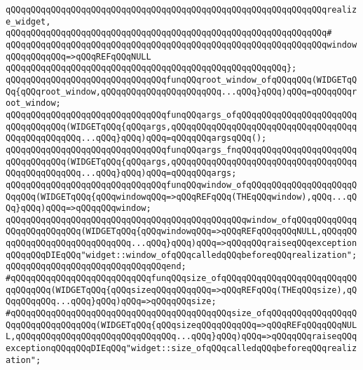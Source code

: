 \verb|qQQqqQQqqQQqqQQqqQQqqQQqqQQqqQQqqQQqqQQqqQQqqQQqqQQqqQQqqQQqqQQqrealize_widget,|\newline
\verb|qQQqqQQqqQQqqQQqqQQqqQQqqQQqqQQqqQQqqQQqqQQqqQQqqQQqqQQqqQQqqQQq#|\newline
\verb|qQQqqQQqqQQqqQQqqQQqqQQqqQQqqQQqqQQqqQQqqQQqqQQqqQQqqQQqqQQqqQQqwindowqQQqqQQqqQQq=>qQQqREFqQQqNULL|\newline
\verb|qQQqqQQqqQQqqQQqqQQqqQQqqQQqqQQqqQQqqQQqqQQqqQQqqQQqqQQq};|\newline
\newline
\verb|qQQqqQQqqQQqqQQqqQQqqQQqqQQqqQQqfunqQQqroot_window_ofqQQqqQQq(WIDGETqQQq{qQQqroot_window,qQQqqQQqqQQqqQQqqQQqqQQq...qQQq}qQQq)qQQq=qQQqqQQqroot_window;|\newline
\verb|qQQqqQQqqQQqqQQqqQQqqQQqqQQqqQQqfunqQQqargs_ofqQQqqQQqqQQqqQQqqQQqqQQqqQQqqQQqqQQq(WIDGETqQQq{qQQqargs,qQQqqQQqqQQqqQQqqQQqqQQqqQQqqQQqqQQqqQQqqQQqqQQqqQQq...qQQq}qQQq)qQQq=qQQqqQQqargsqQQq();|\newline
\verb|qQQqqQQqqQQqqQQqqQQqqQQqqQQqqQQqfunqQQqargs_fnqQQqqQQqqQQqqQQqqQQqqQQqqQQqqQQqqQQq(WIDGETqQQq{qQQqargs,qQQqqQQqqQQqqQQqqQQqqQQqqQQqqQQqqQQqqQQqqQQqqQQqqQQq...qQQq}qQQq)qQQq=qQQqqQQqargs;|\newline
\newline
\verb|qQQqqQQqqQQqqQQqqQQqqQQqqQQqqQQqfunqQQqwindow_ofqQQqqQQqqQQqqQQqqQQqqQQqqQQq(WIDGETqQQq{qQQqwindowqQQq=>qQQqREFqQQq(THEqQQqwindow),qQQq...qQQq}qQQq)qQQq=>qQQqqQQqwindow;|\newline
\verb|qQQqqQQqqQQqqQQqqQQqqQQqqQQqqQQqqQQqqQQqqQQqqQQqwindow_ofqQQqqQQqqQQqqQQqqQQqqQQqqQQq(WIDGETqQQq{qQQqwindowqQQq=>qQQqREFqQQqqQQqNULL,qQQqqQQqqQQqqQQqqQQqqQQqqQQqqQQq...qQQq}qQQq)qQQq=>qQQqqQQqraiseqQQqexceptionqQQqqQQqDIEqQQq"widget::window_ofqQQqcalledqQQqbeforeqQQqrealization";|\newline
\verb|qQQqqQQqqQQqqQQqqQQqqQQqqQQqqQQqend;|\newline
\newline
\verb|#qQQqqQQqqQQqqQQqqQQqqQQqqQQqfunqQQqsize_ofqQQqqQQqqQQqqQQqqQQqqQQqqQQqqQQqqQQq(WIDGETqQQq{qQQqsizeqQQqqQQqqQQq=>qQQqREFqQQq(THEqQQqsize),qQQqqQQqqQQq...qQQq}qQQq)qQQq=>qQQqqQQqsize;|\newline
\verb|#qQQqqQQqqQQqqQQqqQQqqQQqqQQqqQQqqQQqqQQqqQQqsize_ofqQQqqQQqqQQqqQQqqQQqqQQqqQQqqQQqqQQq(WIDGETqQQq{qQQqsizeqQQqqQQqqQQq=>qQQqREFqQQqqQQqNULL,qQQqqQQqqQQqqQQqqQQqqQQqqQQqqQQq...qQQq}qQQq)qQQq=>qQQqqQQqraiseqQQqexceptionqQQqqQQqDIEqQQq"widget::size_ofqQQqcalledqQQqbeforeqQQqrealization";|\newline
